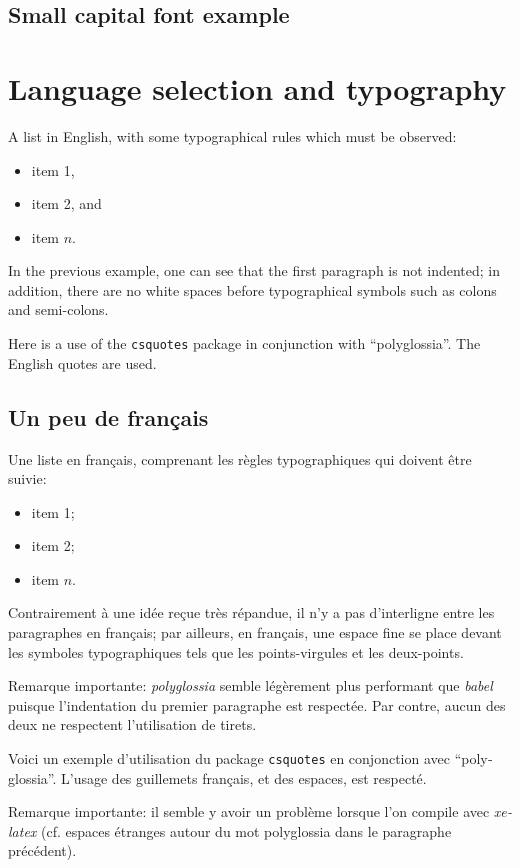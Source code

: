 \documentclass[11pt, a4paper]{report}
\begin{document}
		\textbf{\textit{\lipsum[1]}}
		
	
	\section{Small capital font example}
	
		\textsc{\lipsum[1]}
	

\chapter{Language selection and typography}

	A list in English, with some typographical rules which must be observed:
	\begin{itemize}
		\item item 1,
		\item item 2, and
		\item item $n$.
	\end{itemize}
	
	In the previous example, one can see that the first paragraph is not indented; in addition, there are no white spaces before typographical symbols such as colons and semi-colons.
	
	Here is a use of the \texttt{csquotes} package in conjunction with \enquote{polyglossia}. The English quotes are used. 
	
	
	\begin{french}%
		\section{Un peu de français}
		
		Une liste en français, comprenant les règles typographiques qui doivent être suivie:
		\begin{itemize}
			\item item 1;
			\item item 2;
			\item item $n$.
		\end{itemize}
		
		Contrairement à une idée reçue très répandue, il n'y a pas d'interligne entre les paragraphes en français; par ailleurs, en français, une espace fine se place devant les symboles typographiques tels que les points-virgules et les deux-points.
		
		Remarque importante: \textit{polyglossia} semble légèrement plus performant que \textit{babel} puisque l'indentation du premier paragraphe est respectée. Par contre, aucun des deux ne respectent l'utilisation de tirets.
		
		Voici un exemple d'utilisation du package \texttt{csquotes} en conjonction avec \enquote{polyglossia}. L'usage des guillemets français, et des espaces, est respecté.
		
		Remarque importante: il semble y avoir un problème lorsque l'on compile avec \textit{xelatex} (cf. espaces étranges autour du mot polyglossia dans le paragraphe précédent).
	\end{french}

\end{document}
